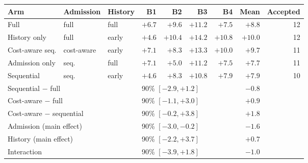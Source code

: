 \begin{tabular}{lllrrrrrr}
\toprule
Arm & Admission & History & B1 & B2 & B3 & B4 & Mean & Accepted \\
\midrule
Full & full & full & $+6.7$ & $+9.6$ & $+11.2$ & $+7.5$ & $+8.8$ & 12 \\
History only & full & early & $+4.6$ & $+10.4$ & $+14.2$ & $+10.8$ & $+10.0$ & 12 \\
Cost-aware seq. & cost-aware & early & $+7.1$ & $+8.3$ & $+13.3$ & $+10.0$ & $+9.7$ & 11 \\
Admission only & seq. & full & $+7.1$ & $+5.0$ & $+11.2$ & $+7.5$ & $+7.7$ & 11 \\
Sequential & seq. & early & $+4.6$ & $+8.3$ & $+10.8$ & $+7.9$ & $+7.9$ & 10 \\
\midrule
\multicolumn{3}{l}{Sequential $-$ full} & \multicolumn{4}{l}{90\% $[-2.9,+1.2]$} & $-0.8$ & \\
\multicolumn{3}{l}{Cost-aware $-$ full} & \multicolumn{4}{l}{90\% $[-1.1,+3.0]$} & $+0.9$ & \\
\multicolumn{3}{l}{Cost-aware $-$ sequential} & \multicolumn{4}{l}{90\% $[-0.2,+3.8]$} & $+1.8$ & \\
\multicolumn{3}{l}{Admission (main effect)} & \multicolumn{4}{l}{90\% $[-3.0,-0.2]$} & $-1.6$ & \\
\multicolumn{3}{l}{History (main effect)} & \multicolumn{4}{l}{90\% $[-2.2,+3.7]$} & $+0.7$ & \\
\multicolumn{3}{l}{Interaction} & \multicolumn{4}{l}{90\% $[-3.9,+1.8]$} & $-1.0$ & \\
\bottomrule
\end{tabular}
